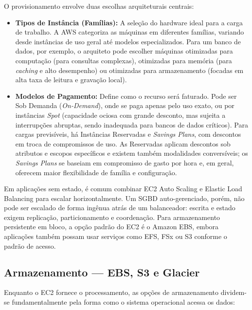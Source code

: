 \documentclass[11pt,a4paper]{article}
\begin{document}
O provisionamento envolve duas escolhas arquiteturais centrais:
\begin{itemize}[leftmargin=*]
    \item \textbf{Tipos de Instância (Famílias):} A seleção do hardware ideal para a carga de trabalho. A AWS categoriza as máquinas em diferentes famílias, variando desde instâncias de uso geral até modelos especializados. Para um banco de dados, por exemplo, o arquiteto pode escolher máquinas otimizadas para computação (para consultas complexas), otimizadas para memória (para \emph{caching} e alto desempenho) ou otimizadas para armazenamento (focadas em alta taxa de leitura e gravação local).
    \item \textbf{Modelos de Pagamento:} Define como o recurso será faturado. Pode ser Sob Demanda (\emph{On-Demand}), onde se paga apenas pelo uso exato, ou por instâncias \emph{Spot} (capacidade ociosa com grande desconto, mas sujeita a interrupções abruptas, sendo inadequada para bancos de dados críticos). Para cargas previsíveis, há Instâncias Reservadas e \emph{Savings Plans}, com descontos em troca de compromissos de uso. As Reservadas aplicam descontos sob atributos e escopos específicos e existem também modalidades conversíveis; os \emph{Savings Plans} se baseiam em compromisso de gasto por hora e, em geral, oferecem maior flexibilidade de família e configuração.
\end{itemize}
Em aplicações sem estado, é comum combinar EC2 Auto Scaling e Elastic Load Balancing para escalar horizontalmente. Um SGBD auto-gerenciado, porém, não pode ser escalado de forma ingênua atrás de um balanceador: escrita e estado exigem replicação, particionamento e coordenação. Para armazenamento persistente em bloco, a opção padrão do EC2 é o Amazon EBS, embora aplicações também possam usar serviços como EFS, FSx ou S3 conforme o padrão de acesso.

\subsection{Armazenamento --- EBS, S3 e Glacier}
Enquanto o EC2 fornece o processamento, as opções de armazenamento dividem-se fundamentalmente pela forma como o sistema operacional acessa os dados:
\end{document}
